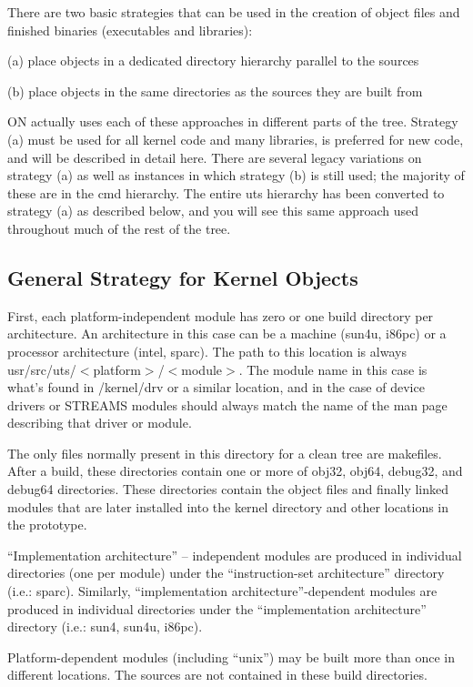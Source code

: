 \documentclass{article}
\begin{document}
There are two basic strategies that can be used in the creation of object files
and finished binaries (executables and libraries):
\vspace{0.2cm}

(a) place objects in a dedicated directory hierarchy parallel to the sources

(b) place objects in the same directories as the sources they are built from

ON actually uses each of these approaches in different parts of the
tree. Strategy (a) must be used for all kernel code and many libraries, is
preferred for new code, and will be described in detail here. There are several
legacy variations on strategy (a) as well as instances in which strategy (b) is
still used; the majority of these are in the cmd hierarchy. The entire uts
hierarchy has been converted to strategy (a) as described below, and you will
see this same approach used throughout much of the rest of the tree.

\subsection*{General Strategy for Kernel Objects}

First, each platform-independent module has zero or one build directory per
architecture. An architecture in this case can be a machine (sun4u, i86pc) or a
processor architecture (intel, sparc). The path to this location is always
usr/src/uts/$<$platform$>$/$<$module$>$. The module name in this case is what's
found in /kernel/drv or a similar location, and in the case of device drivers or
STREAMS modules should always match the name of the man page describing that
driver or module.

The only files normally present in this directory for a clean tree are
makefiles. After a build, these directories contain one or more of obj32, obj64,
debug32, and debug64 directories. These directories contain the object files and
finally linked modules that are later installed into the kernel directory and
other locations in the prototype.

``Implementation architecture'' -- independent modules are produced in
individual directories (one per module) under the ``instruction-set
architecture'' directory (i.e.: sparc). Similarly, ``implementation
architecture''-dependent modules are produced in individual directories under
the ``implementation architecture'' directory (i.e.: sun4, sun4u, i86pc).

Platform-dependent modules (including ``unix'') may be built more than once in
different locations. The sources are not contained in these build directories.
\end{document}
